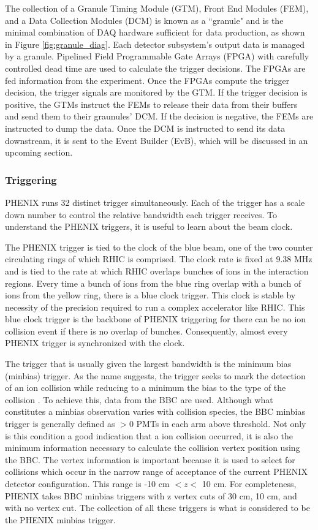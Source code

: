 The collection of a  Granule Timing Module (GTM), Front End Modules (FEM), and a Data Collection Modules (DCM) is known as a ``granule" and is the minimal combination of DAQ hardware sufficient for data production, as shown in Figure \ref{fig:granule_diag}. Each detector subsystem's output data is managed by a granule. Pipelined Field Programmable Gate Arrays (FPGA) with carefully controlled dead time are used to calculate the trigger decisions. The FPGAs are fed information from the experiment. Once the FPGAs compute the trigger decision, the trigger signals are monitored by the GTM. If the trigger decision is positive, the GTMs instruct the FEMs to release their data from their buffers and send them to their graunules' DCM. If the decision is negative, the FEMs are instructed to dump the data.  Once the DCM is instructed to send its data downstream, it is sent to the Event Builder (EvB), which will be discussed in an upcoming section.

\subsubsection{Triggering}
PHENIX runs 32 distinct trigger simultaneously. Each of the trigger has a scale down number to control the relative bandwidth each trigger receives. To understand the PHENIX triggers, it is useful to learn about the beam clock.

The PHENIX trigger is tied to the clock of the blue beam, one of the two counter circulating rings of which RHIC is comprised. The clock rate is fixed at 9.38 MHz and is tied to the rate at which RHIC overlaps bunches of ions in the interaction regions. Every time a bunch of ions from the blue ring overlap with a bunch of ions from the yellow ring, there is a blue clock trigger. This clock is stable by necessity of the precision required to run a complex accelerator like RHIC. This blue clock trigger is the backbone of PHENIX triggering for there can be no ion collision event if there is no overlap of bunches. Consequently, almost every PHENIX trigger is synchronized with the clock.

The trigger that is usually given the largest bandwidth is the minimum bias (minbias) trigger. As the name suggests, the trigger seeks to mark the detection of an ion collision while reducing to a minimum the bias to the type of the collision . To achieve this, data from the BBC are used. Although what constitutes a minbias observation varies with collision species, the BBC minbias trigger is generally defined as $>$0 PMTs in each arm above threshold. Not only is this condition a good indication that a ion collision occurred, it is also the minimum information necessary to calculate the collision vertex position using the BBC. The vertex information is important because it is used to select for collisions which occur in the narrow range of acceptance of the current PHENIX detector configuration. This range is -10 cm $< z<$ 10 cm. For completeness, PHENIX takes BBC minbias triggers with z vertex cuts of 30 cm, 10 cm, and with no vertex cut. The collection of all these triggers is what is considered to be the PHENIX minbias trigger.

